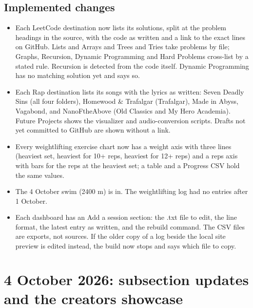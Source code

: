 \documentclass[11pt]{article}
\begin{document}
\subsection{Implemented changes}
\begin{itemize}
\item Each LeetCode destination now lists its solutions, split at the problem headings in the source, with the code as written and a link to the exact lines on GitHub. Lists and Arrays and Trees and Tries take problems by file; Graphs, Recursion, Dynamic Programming and Hard Problems cross-list by a stated rule. Recursion is detected from the code itself. Dynamic Programming has no matching solution yet and says so.
\item Each Rap destination lists its songs with the lyrics as written: Seven Deadly Sins (all four folders), Homewood \& Trafalgar (Trafalgar), Made in Abyss, Vagabond, and NanoFtheAbove (Old Classics and My Hero Academia). Future Projects shows the visualizer and audio-conversion scripts. Drafts not yet committed to GitHub are shown without a link.
\item Every weightlifting exercise chart now has a weight axis with three lines (heaviest set, heaviest for 10+ reps, heaviest for 12+ reps) and a reps axis with bars for the reps at the heaviest set; a table and a Progress CSV hold the same values.
\item The 4 October swim (2400 m) is in. The weightlifting log had no entries after 1 October.
\item Each dashboard has an Add a session section: the .txt file to edit, the line format, the latest entry as written, and the rebuild command. The CSV files are exports, not sources. If the older copy of a log beside the local site preview is edited instead, the build now stops and says which file to copy.
\end{itemize}

\section{4 October 2026: subsection updates and the creators showcase}
\end{document}
